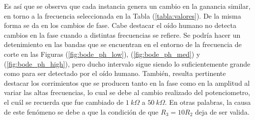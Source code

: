 Es así que se observa que cada instancia genera un cambio en la ganancia similar, en torno a la frecuencia seleccionada en la Tabla (\ref{tabla:valores}). De la misma forma se da en los cambios de fase. Cabe destacar el oído humano no detecta cambios en la fase cuando a distintas frecuencias se refiere. Se podría hacer un detenimiento en las bandas que se encuentran en el entorno de la frecuencia de corte en las Figuras (\ref{fig:bode_ph_low}), (\ref{fig:bode_ph_med}) y (\ref{fig:bode_ph_high}), pero ducho intervalo sigue siendo lo suficientemente grande como para ser detectado por el oído humano. También, resulta pertinente destacar los corrimientos que se producen tanto en la fase como en la amplitud al variar las altas frecuencias, lo cual se debe al cambio realizado del potenciometro, el cuál se recuerda que fue cambiado de $1 \ k\Omega$ a $50 \ k\Omega$. En otras palabras, la causa de este fenómeno se debe a que la condición de que $R_3 = 10R_2$ deja de ser valida.

